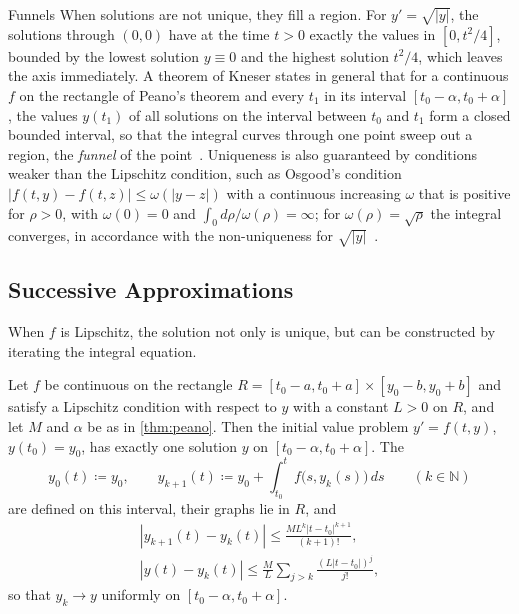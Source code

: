 \begin{note}{Funnels}
When solutions are not unique, they fill a region. For $y'=\sqrt{|y|}$, the solutions through $(0,0)$ have at the time $t>0$ exactly the values in $[0,t^2/4]$, bounded by the lowest solution $y\equiv0$ and the highest solution $t^2/4$, which leaves the axis immediately. A theorem of Kneser states in general that for a continuous $f$ on the rectangle of Peano's theorem and every $t_1$ in its interval $[t_0-\alpha,t_0+\alpha]$, the values $y(t_1)$ of all solutions on the interval between $t_0$ and $t_1$ form a closed bounded interval, so that the integral curves through one point sweep out a region, the \emph{funnel} of the point~\cite[Chap.~II]{hartman2002}. Uniqueness is also guaranteed by conditions weaker than the Lipschitz condition, such as Osgood's condition $|f(t,y)-f(t,z)|\le\omega(|y-z|)$ with a continuous increasing $\omega$ that is positive for $\rho>0$, with $\omega(0)=0$ and $\int_0d\rho/\omega(\rho)=\infty$; for $\omega(\rho)=\sqrt\rho$ the integral converges, in accordance with the non-uniqueness for $\sqrt{|y|}$~\cite[Chap.~III]{hartman2002}.
\end{note}

\subsection{Successive Approximations}

When $f$ is Lipschitz, the solution not only is unique, but can be constructed by iterating the integral equation.

\begin{theorem}
\label{thm:picard-lindelof}
Let $f$ be continuous on the rectangle $R=[t_0-a,t_0+a]\times[y_0-b,y_0+b]$ and satisfy a Lipschitz condition with respect to $y$ with a constant $L>0$ on $R$, and let $M$ and $\alpha$ be as in \cref{thm:peano}. Then the initial value problem $y'=f(t,y)$, $y(t_0)=y_0$, has exactly one solution $y$ on $[t_0-\alpha,t_0+\alpha]$. The 
\[
y_0(t)\coloneqq y_0,\qquad y_{k+1}(t)\coloneqq y_0+\int_{t_0}^tf\bigl(s,y_k(s)\bigr)\,ds\qquad(k\in\mathbb N)
\]
are defined on this interval, their graphs lie in $R$, and
\begin{gather*}
|y_{k+1}(t)-y_k(t)|\le\frac{ML^k|t-t_0|^{k+1}}{(k+1)!},\\
|y(t)-y_k(t)|\le\frac ML\sum_{j>k}\frac{(L|t-t_0|)^j}{j!} ,
\end{gather*}
so that $y_k\to y$ uniformly on $[t_0-\alpha,t_0+\alpha]$.
\end{theorem}

